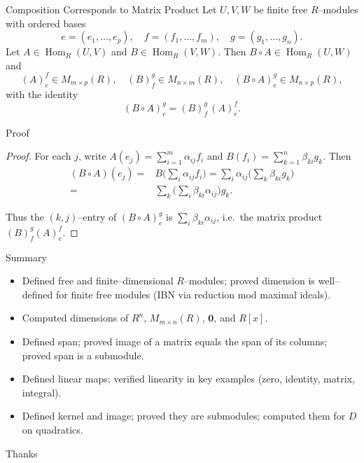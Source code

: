 \begin{frame}{Composition Corresponds to Matrix Product}
Let $U,V,W$ be finite free $R$–modules with ordered bases
\[
e=(e_1,\dots,e_p),\quad f=(f_1,\dots,f_m),\quad g=(g_1,\dots,g_n).
\]
Let $A\in\operatorname{Hom}_R(U,V)$ and $B\in\operatorname{Hom}_R(V,W)$. Then $B\circ A\in\operatorname{Hom}_R(U,W)$ and
\[
(A)_e^f\in M_{m\times p}(R),\quad (B)_f^g\in M_{n\times m}(R),\quad (B\circ A)_e^g\in M_{n\times p}(R),
\]
with the identity
\[
(B\circ A)_e^g=(B)_f^g\,(A)_e^f.
\]
\begin{center}
\end{center}

\end{frame}

\begin{frame}{Proof}
    \begin{proof}
For each $j$, write $A(e_j)=\sum_{i=1}^m \alpha_{ij} f_i$ and $B(f_i)=\sum_{k=1}^n \beta_{ki} g_k$.
Then
\begin{align*}
    (B\circ A)(e_j)=&B\Big(\sum_i \alpha_{ij} f_i\Big)=\sum_i \alpha_{ij} \Big(\sum_k \beta_{ki} g_k\Big)\\
=&\sum_k \Big(\sum_i \beta_{ki}\alpha_{ij}\Big) g_k.
\end{align*}

Thus the $(k,j)$–entry of $(B\circ A)_e^g$ is $\sum_i \beta_{ki}\alpha_{ij}$, i.e.\ the matrix product $(B)_f^g (A)_e^f$.
\end{proof}
\end{frame}

\begin{frame}{Summary}
\begin{itemize}
  \item Defined free and finite–dimensional $R$–modules; proved dimension is well–defined for finite free modules (IBN via reduction mod maximal ideals).
  \item Computed dimensions of $R^n$, $M_{m\times n}(R)$, $\mathbf{0}$, and $R[x]$.
  \item Defined span; proved image of a matrix equals the span of its columns; proved span is a submodule.
  \item Defined linear maps; verified linearity in key examples (zero, identity, matrix, integral).
  \item Defined kernel and image; proved they are submodules; computed them for $D$ on quadratics.
\end{itemize}
\end{frame}

\begin{frame}{Thanks}
  \cmcendframe
\end{frame}


